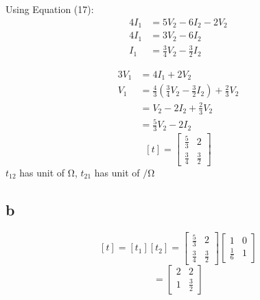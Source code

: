 \documentclass{article}
\begin{document}
\begin{multicols}{2}
Using Equation (17):
\begin{align*}
    4 I_1 &= 5 V_2 - 6 I_2 -2 V_2\\
    4 I_1 &= 3 V_2 - 6 I_2\\
    I_1 &= \frac{3}{4} V_2 - \frac{3}{2} I_2
\end{align*}

\begin{align*}
3 V_1 &= 4 I_1 + 2 V_2\\
 V_1 &= \frac{4}{3} \left( \frac{3}{4} V_2 - \frac{3}{2} I_2\right) +\frac{2}{3} V_2\\
 &= V_2 - 2 I_2 + \frac{2}{3} V_2\\
 &= \frac{5}{3} V_2 - 2I_2
\end{align*}
$$
[t] = 
  \begin{bmatrix}
  \frac{5}{3} & 2\\
  \frac{3}{4} & \frac{3}{2}
  \end{bmatrix}
$$
$t_{12}$ has unit of $\si{\ohm}$, $t_{21}$ has unit of $\si{\per\ohm}$
\subsection*{b}
$$
[t] = [t_1][t_2] = 
  \begin{bmatrix}
  \frac{5}{3} & 2\\
  \frac{3}{4} & \frac{3}{2}
  \end{bmatrix}
  \begin{bmatrix}
  1 & 0\\
  \frac{1}{6} & 1
  \end{bmatrix}
$$
$$
= 
  \begin{bmatrix}
  2 & 2\\
  1 & \frac{3}{2}
  \end{bmatrix}
$$

\end{multicols}
\end{document}
